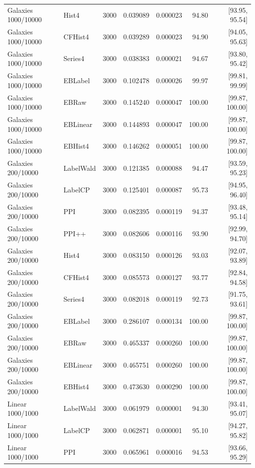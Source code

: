 \begin{longtable}{llrrrrr}
Galaxies 1000/10000 & Hist4 & 3000 & 0.039089 & 0.000023 & 94.80 & [93.95, 95.54]\\
Galaxies 1000/10000 & CFHist4 & 3000 & 0.039289 & 0.000023 & 94.90 & [94.05, 95.63]\\
Galaxies 1000/10000 & Series4 & 3000 & 0.038383 & 0.000021 & 94.67 & [93.80, 95.42]\\
Galaxies 1000/10000 & EBLabel & 3000 & 0.102478 & 0.000026 & 99.97 & [99.81, 99.99]\\
Galaxies 1000/10000 & EBRaw & 3000 & 0.145240 & 0.000047 & 100.00 & [99.87, 100.00]\\
Galaxies 1000/10000 & EBLinear & 3000 & 0.144893 & 0.000047 & 100.00 & [99.87, 100.00]\\
Galaxies 1000/10000 & EBHist4 & 3000 & 0.146262 & 0.000051 & 100.00 & [99.87, 100.00]\\
Galaxies 200/10000 & LabelWald & 3000 & 0.121385 & 0.000088 & 94.47 & [93.59, 95.23]\\
Galaxies 200/10000 & LabelCP & 3000 & 0.125401 & 0.000087 & 95.73 & [94.95, 96.40]\\
Galaxies 200/10000 & PPI & 3000 & 0.082395 & 0.000119 & 94.37 & [93.48, 95.14]\\
Galaxies 200/10000 & PPI++ & 3000 & 0.082606 & 0.000116 & 93.90 & [92.99, 94.70]\\
Galaxies 200/10000 & Hist4 & 3000 & 0.083150 & 0.000126 & 93.03 & [92.07, 93.89]\\
Galaxies 200/10000 & CFHist4 & 3000 & 0.085573 & 0.000127 & 93.77 & [92.84, 94.58]\\
Galaxies 200/10000 & Series4 & 3000 & 0.082018 & 0.000119 & 92.73 & [91.75, 93.61]\\
Galaxies 200/10000 & EBLabel & 3000 & 0.286107 & 0.000134 & 100.00 & [99.87, 100.00]\\
Galaxies 200/10000 & EBRaw & 3000 & 0.465337 & 0.000260 & 100.00 & [99.87, 100.00]\\
Galaxies 200/10000 & EBLinear & 3000 & 0.465751 & 0.000260 & 100.00 & [99.87, 100.00]\\
Galaxies 200/10000 & EBHist4 & 3000 & 0.473630 & 0.000290 & 100.00 & [99.87, 100.00]\\
Linear 1000/1000 & LabelWald & 3000 & 0.061979 & 0.000001 & 94.30 & [93.41, 95.07]\\
Linear 1000/1000 & LabelCP & 3000 & 0.062871 & 0.000001 & 95.10 & [94.27, 95.82]\\
Linear 1000/1000 & PPI & 3000 & 0.065961 & 0.000016 & 94.53 & [93.66, 95.29]\\

\end{longtable}
